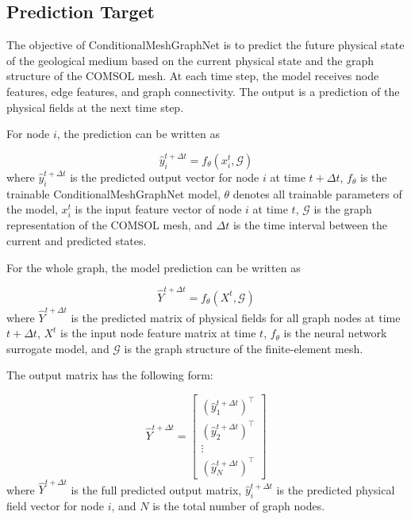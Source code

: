 \subsection{Prediction Target}

The objective of ConditionalMeshGraphNet is to predict the future physical state of the geological medium based on the current physical state and the graph structure of the COMSOL mesh. At each time step, the model receives node features, edge features, and graph connectivity. The output is a prediction of the physical fields at the next time step.

For node \(i\), the prediction can be written as

\begin{equation}
\hat{y}_i^{t+\Delta t}
=
f_{\theta}
\left(
x_i^t,
\mathcal{G}
\right)
\end{equation}
where \(\hat{y}_i^{t+\Delta t}\) is the predicted output vector for node \(i\) at time \(t+\Delta t\), \(f_{\theta}\) is the trainable ConditionalMeshGraphNet model, \(\theta\) denotes all trainable parameters of the model, \(x_i^t\) is the input feature vector of node \(i\) at time \(t\), \(\mathcal{G}\) is the graph representation of the COMSOL mesh, and \(\Delta t\) is the time interval between the current and predicted states.

For the whole graph, the model prediction can be written as

\begin{equation}
\hat{Y}^{t+\Delta t}
=
f_{\theta}
\left(
X^{t},
\mathcal{G}
\right)
\end{equation}
where \(\hat{Y}^{t+\Delta t}\) is the predicted matrix of physical fields for all graph nodes at time \(t+\Delta t\), \(X^{t}\) is the input node feature matrix at time \(t\), \(f_{\theta}\) is the neural network surrogate model, and \(\mathcal{G}\) is the graph structure of the finite-element mesh.

The output matrix has the following form:

\begin{equation}
\hat{Y}^{t+\Delta t}
=
\begin{bmatrix}
(\hat{y}_1^{t+\Delta t})^{\top} \\
(\hat{y}_2^{t+\Delta t})^{\top} \\
\vdots \\
(\hat{y}_N^{t+\Delta t})^{\top}
\end{bmatrix}
\end{equation}
where \(\hat{Y}^{t+\Delta t}\) is the full predicted output matrix, \(\hat{y}_i^{t+\Delta t}\) is the predicted physical field vector for node \(i\), and \(N\) is the total number of graph nodes.

